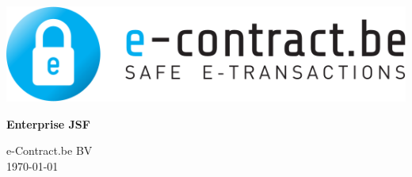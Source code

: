 \documentclass[12pt, a4paper]{report}
\begin{document}
\begin{titlepage}
\begin{center}
\includegraphics[scale=0.8]{e-contract-logoFINAL}
\end{center}
\vspace{8cm}
\begin{center}
{\fontsize{50}{60}\selectfont\textbf{Enterprise JSF}}
\end{center}
\vspace{8cm}
\begin{flushright}
e-Contract.be BV\\
\today
\end{flushright}
\end{titlepage}

\setcounter{tocdepth}{3}
\setcounter{secnumdepth}{3}
\tableofcontents




























\listoffigures

\listoftables
\end{document}
